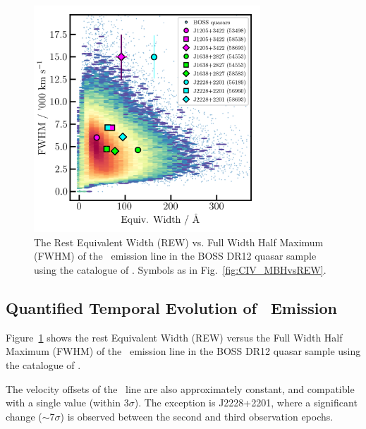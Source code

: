 \documentclass[fleqn,usenatbib]{mnras}
\begin{document}
\begin{figure}
  \centering
  \includegraphics[width=8.5cm, trim=0.2cm 0.2cm 0.0cm 0.2cm, clip]
  {figures/CIV_CLQs_REWvsFWHM_20191128.png}
  \vspace{-12pt}
  \caption[]{The Rest Equivalent Width (REW) vs. Full Width Half Maximum (FWHM) 
    of the \civ\ emission line in the BOSS DR12 quasar sample using the catalogue 
    of \citet{Hamann2017}.
   Symbols as in Fig.~\ref{fig:CIV_MBHvsREW}.}
  \label{fig:REWvsFWHM}
\end{figure}
\subsection{Quantified Temporal Evolution of \civ\ Emission}
Figure~\ref{fig:REWvsFWHM} shows the rest Equivalent Width (REW)
versus the Full Width Half Maximum (FWHM) of the \civ\ emission line
in the BOSS DR12 quasar sample using the catalogue of
\citet{Hamann2017}. 

The velocity offsets of the \civ\ line are also
approximately constant, and compatible with a single value (within
3$\sigma$).  The exception is J2228+2201, where a significant change
($\sim$7$\sigma$) is observed between the second and third observation
epochs.
\end{document}
